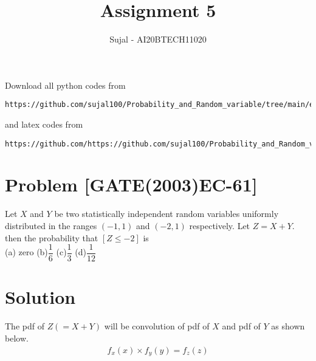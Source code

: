 \documentclass[journal,12pt,twocolumn]{IEEEtran}
\begin{document}
\let\StandardTheFigure\thefigure
\let\vec\mathbf
\renewcommand{\thefigure}{\theproblem}
\def\putbox#1#2#3{\makebox[0in][l]{\makebox[#1][l]{}\raisebox{\baselineskip}[0in][0in]{\raisebox{#2}[0in][0in]{#3}}}}
     \def\rightbox#1{\makebox[0in][r]{#1}}
     \def\centbox#1{\makebox[0in]{#1}}
     \def\topbox#1{\raisebox{-\baselineskip}[0in][0in]{#1}}
     \def\midbox#1{\raisebox{-0.5\baselineskip}[0in][0in]{#1}}
\vspace{3cm}
\title{Assignment 5}
\author{Sujal - AI20BTECH11020}
\maketitle
\newpage
\bigskip
\renewcommand{\thefigure}{\theenumi}
\renewcommand{\thetable}{\theenumi}
Download all python codes from 
\begin{lstlisting}
https://github.com/sujal100/Probability_and_Random_variable/tree/main/exercise_5/codes
\end{lstlisting}

and latex codes from 

\begin{lstlisting}
https://github.com/https://github.com/sujal100/Probability_and_Random_variable/blob/main/exercise_5/exercise_5_main_tex.tex
\end{lstlisting}
\section{Problem [GATE(2003)EC-61]}
Let $X$ and $Y$ be two statistically independent random variables uniformly
distributed in the ranges $(-1,1)$ and $(-2,1)$ respectively. Let $Z = X + Y.$ then the probability that $[Z\leq-2]$ is\\
(a) zero
(b)$\dfrac{1}{6}$
(c)$\dfrac{1}{3}$
(d)$\dfrac{1}{12}$
\section{Solution}
The pdf of $Z(=X+Y)$ will be convolution of pdf of $X$ and pdf of $Y$ as shown below.
\begin{align}
f_{x}( x)\times f_{y}(y)=f_{z}(z)
\end{align}

\end{document}
